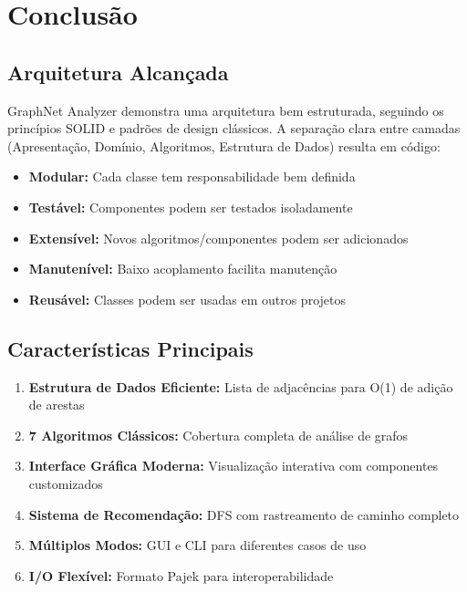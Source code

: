 \documentclass[12pt,a4paper]{article}
\begin{document}
\newpage

\section{Conclusão}

\subsection{Arquitetura Alcançada}

GraphNet Analyzer demonstra uma arquitetura bem estruturada, seguindo os princípios SOLID e padrões de design clássicos. A separação clara entre camadas (Apresentação, Domínio, Algoritmos, Estrutura de Dados) resulta em código:

\begin{itemize}
    \item \textbf{Modular:} Cada classe tem responsabilidade bem definida
    \item \textbf{Testável:} Componentes podem ser testados isoladamente
    \item \textbf{Extensível:} Novos algoritmos/componentes podem ser adicionados
    \item \textbf{Manutenível:} Baixo acoplamento facilita manutenção
    \item \textbf{Reusável:} Classes podem ser usadas em outros projetos
\end{itemize}

\subsection{Características Principais}

\begin{enumerate}
    \item \textbf{Estrutura de Dados Eficiente:} Lista de adjacências para O(1) de adição de arestas
    \item \textbf{7 Algoritmos Clássicos:} Cobertura completa de análise de grafos
    \item \textbf{Interface Gráfica Moderna:} Visualização interativa com componentes customizados
    \item \textbf{Sistema de Recomendação:} DFS com rastreamento de caminho completo
    \item \textbf{Múltiplos Modos:} GUI e CLI para diferentes casos de uso
    \item \textbf{I/O Flexível:} Formato Pajek para interoperabilidade
\end{enumerate}
\end{document}
